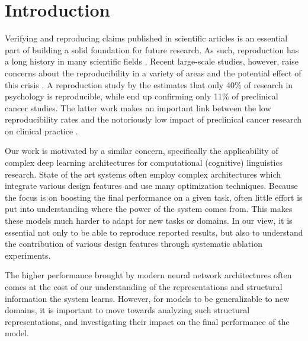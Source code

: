 \section{Introduction}
Verifying and reproducing claims published in scientific articles is an 
essential part of building a solid foundation for future research. As such, 
reproduction has a long history in many scientific fields 
\citep{willett1985reproducibility,venables1993respiratory,
waltemath2011reproducible}. 
Recent large-scale studies, however, raise concerns about the reproducibility 
in a variety of areas and the potential effect of this crisis \citep{baker20161}. 
A reproduction study by the \citet{open2015estimating} estimates that only 40\% 
of research in psychology is reproducible, while \citet{begley2012drug} end 
up confirming only 11\% of preclinical cancer studies. The latter work makes 
an important link between the low reproducibility rates and the notoriously 
low impact of preclinical cancer research on clinical practice 
\citep{hutchinson2011high}.  

Our work is motivated by a similar concern, specifically the applicability of 
complex deep learning architectures for computational 
(cognitive) linguistics research. State of the art systems often employ complex 
architectures which integrate various design features and use many optimization
techniques. Because the focus is on boosting the final performance on a given 
task, often little effort is put into understanding where the power of the 
system comes from. This makes these models much harder to adapt for new tasks or 
domains. In our view, it is essential not only to be able to reproduce reported 
results, but also to understand the contribution of various design features through systematic ablation experiments.

The higher performance brought by modern neural network architectures often 
comes at the cost of our understanding of the representations and structural 
information the system learns. However, for models to be generalizable to new 
domains, it is important to move towards analyzing such structural 
representations, and investigating their impact on the final performance of 
the model.

